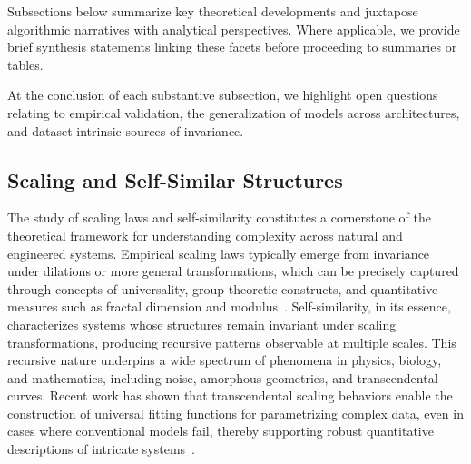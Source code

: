 \documentclass[sigconf]{acmart}
\begin{document}
Subsections below summarize key theoretical developments and juxtapose algorithmic narratives with analytical perspectives. Where applicable, we provide brief synthesis statements linking these facets before proceeding to summaries or tables.

At the conclusion of each substantive subsection, we highlight open questions relating to empirical validation, the generalization of models across architectures, and dataset-intrinsic sources of invariance.


\subsection{Scaling and Self-Similar Structures}

The study of scaling laws and self-similarity constitutes a cornerstone of the theoretical framework for understanding complexity across natural and engineered systems. Empirical scaling laws typically emerge from invariance under dilations or more general transformations, which can be precisely captured through concepts of universality, group-theoretic constructs, and quantitative measures such as fractal dimension and modulus~\cite{ref56,ref63}. Self-similarity, in its essence, characterizes systems whose structures remain invariant under scaling transformations, producing recursive patterns observable at multiple scales. This recursive nature underpins a wide spectrum of phenomena in physics, biology, and mathematics, including noise, amorphous geometries, and transcendental curves. Recent work has shown that transcendental scaling behaviors enable the construction of universal fitting functions for parametrizing complex data, even in cases where conventional models fail, thereby supporting robust quantitative descriptions of intricate systems~\cite{ref56,ref63}.
\end{document}
